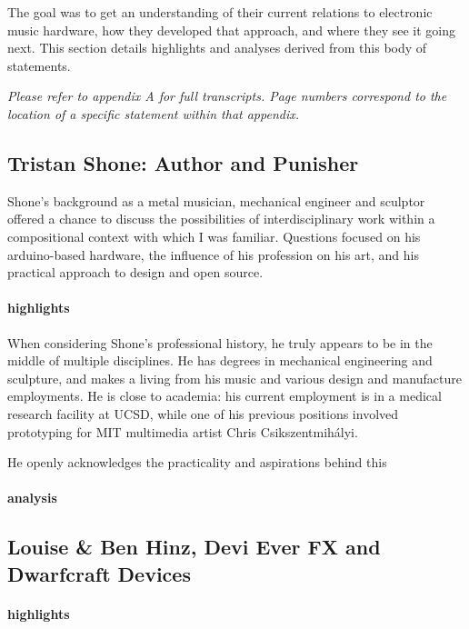 The goal was to get an understanding of their current relations to electronic music hardware, how they developed that approach, and where they see it going next. This section details highlights and analyses derived from this body of statements. 

\emph{Please refer to appendix A for full transcripts. Page numbers correspond to the location of a specific statement within that appendix. }

\subsection{Tristan Shone: Author and Punisher}

Shone's background as a metal musician, mechanical engineer and sculptor offered a chance to discuss the possibilities of interdisciplinary work within a compositional context with which I was familiar. Questions focused on his arduino-based hardware, the influence of his profession on his art, and his practical approach to design and open source. 

\paragraph{highlights}

When considering Shone's professional history, he truly appears to be in the middle of multiple disciplines. He has degrees in mechanical engineering and sculpture, and makes a living from his music and various design and manufacture employments. He is close to academia: his current employment is in a medical research facility at UCSD, while one of his previous positions involved prototyping for MIT multimedia artist Chris Csikszentmihályi. 

He openly acknowledges the practicality and aspirations behind this 

\paragraph{analysis}



\subsection{Louise \& Ben Hinz, Devi Ever FX and Dwarfcraft Devices}
\paragraph{highlights}
